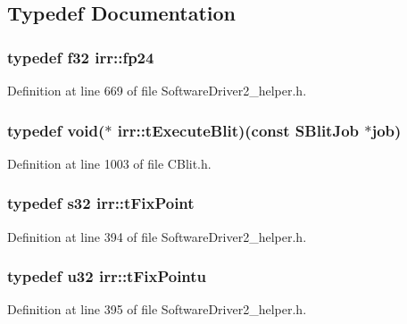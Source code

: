\subsection{Typedef Documentation}
\hypertarget{namespaceirr_aebc1099fc704ff027ddbc3cc7231d9c2}{
\subsubsection[{fp24}]{\setlength{\rightskip}{0pt plus 5cm}typedef f32 {\bf irr\-::fp24}}}\label{namespaceirr_aebc1099fc704ff027ddbc3cc7231d9c2}


Definition at line 669 of file Software\-Driver2\-\_\-helper.\-h.

\hypertarget{namespaceirr_a0884da614eab7ae475c55550c2f97bd0}{
\subsubsection[{t\-Execute\-Blit}]{\setlength{\rightskip}{0pt plus 5cm}typedef {\bf void}($\ast$ irr\-::t\-Execute\-Blit)(const {\bf S\-Blit\-Job} $\ast$job)}}\label{namespaceirr_a0884da614eab7ae475c55550c2f97bd0}


Definition at line 1003 of file C\-Blit.\-h.

\hypertarget{namespaceirr_a705cfbd95ac6f0e531f1b341af6fae39}{
\subsubsection[{t\-Fix\-Point}]{\setlength{\rightskip}{0pt plus 5cm}typedef s32 {\bf irr\-::t\-Fix\-Point}}}\label{namespaceirr_a705cfbd95ac6f0e531f1b341af6fae39}


Definition at line 394 of file Software\-Driver2\-\_\-helper.\-h.

\hypertarget{namespaceirr_abd8e4c96433c2eecb4b48987f9cd7859}{
\subsubsection[{t\-Fix\-Pointu}]{\setlength{\rightskip}{0pt plus 5cm}typedef u32 {\bf irr\-::t\-Fix\-Pointu}}}\label{namespaceirr_abd8e4c96433c2eecb4b48987f9cd7859}


Definition at line 395 of file Software\-Driver2\-\_\-helper.\-h.

